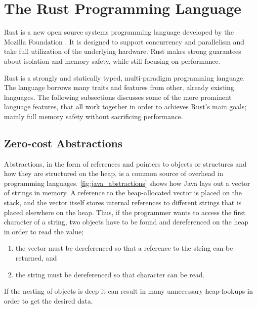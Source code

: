 
\section{The Rust Programming Language} %
\label{sub:the_rust_programming_language}

Rust \cite{web:rust_lang} is a new open source systems programming language developed by the Mozilla
Foundation \cite{web:mozilla_foundation}. It is designed to support concurrency and parallelism and
take full utilization of the underlying hardware. Rust makes strong guarantees about isolation and
memory safety, while still focusing on performance.

Rust is a strongly and statically typed, multi-paradigm programming language. The language borrows
many traits and features from other, already existing languages. The following subsections discusses
some of the more prominent language features, that all work together in order to achieves Rust's
main goals; mainly full memory safety without sacrificing performance.

\subsection{Zero-cost Abstractions}
\label{chap:zero_cost_abstractions}

Abstractions, in the form of references and pointers to objects or structures and how they are
structured on the heap, is a common source of overhead in programming languages.
\autoref{fig:java_abstractions}  shows how Java lays out a vector of
strings in memory. A reference to the heap-allocated vector is placed on the stack, and the vector
itself stores internal references to different strings that is placed elsewhere on the heap. Thus,
if the programmer wants to access the first character of a string, two objects have to be found and
dereferenced on the heap in order to read the value;

\begin{enumerate}
  \item the vector must be dereferenced so that a reference to the string can be returned, and
  \item the string must be dereferenced so that character can be read.
\end{enumerate}

If the nesting of objects is deep it can result in many unnecessary heap-lookups in order to get the
desired data.

